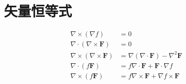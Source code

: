 \section{矢量恒等式}
\begin{align}
    \nabla \times (\nabla f) &= 0 \\
    \nabla \cdot (\nabla \times \boldsymbol{F}) &= 0 \\
    \nabla \times (\nabla \times \boldsymbol{F}) &= \nabla(\nabla \cdot \boldsymbol{F}) - \nabla^2 \boldsymbol{F} \\
    \nabla \cdot (f\boldsymbol{F}) &= f\nabla \cdot \boldsymbol{F} + \boldsymbol{F} \cdot \nabla f \\
    \nabla \times (f\boldsymbol{F}) &= f\nabla \times \boldsymbol{F} + \nabla f \times \boldsymbol{F}
\end{align}
